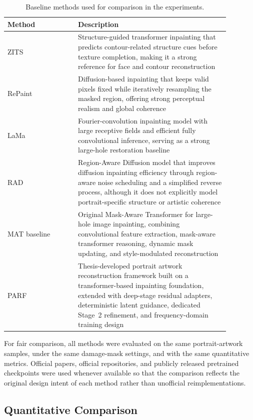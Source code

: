 \documentclass[12pt, twoside]{report}
\begin{document}
\begin{table}[H]
\centering
\caption{Baseline methods used for comparison in the experiments.}
\label{tab:baselines}
\begin{tabular}{p{0.28\linewidth} p{0.6\linewidth}}
\toprule
\textbf{Method} & \textbf{Description} \\
\midrule
ZITS~\cite{zeng2022zits} & Structure-guided transformer inpainting that predicts contour-related structure cues before texture completion, making it a strong reference for face and contour reconstruction \\
RePaint~\cite{lugmayr2022repaint} & Diffusion-based inpainting that keeps valid pixels fixed while iteratively resampling the masked region, offering strong perceptual realism and global coherence \\
LaMa~\cite{suvorov2022lama} & Fourier-convolution inpainting model with large receptive fields and efficient fully convolutional inference, serving as a strong large-hole restoration baseline \\
RAD~\cite{kim2025rad} & Region-Aware Diffusion model that improves diffusion inpainting efficiency through region-aware noise scheduling and a simplified reverse process, although it does not explicitly model portrait-specific structure or artistic coherence \\
MAT baseline~\cite{li2022mat} & Original Mask-Aware Transformer for large-hole image inpainting, combining convolutional feature extraction, mask-aware transformer reasoning, dynamic mask updating, and style-modulated reconstruction \\
PARF & Thesis-developed portrait artwork reconstruction framework built on a transformer-based inpainting foundation, extended with deep-stage residual adapters, deterministic latent guidance, dedicated Stage~2 refinement, and frequency-domain training design \\
\bottomrule
\end{tabular}
\end{table}

For fair comparison, all methods were evaluated on the same portrait-artwork samples, under the same damage-mask settings, and with the same quantitative metrics. Official papers, official repositories, and publicly released pretrained checkpoints were used whenever available so that the comparison reflects the original design intent of each method rather than unofficial reimplementations.

\subsection{Quantitative Comparison}
\end{document}
